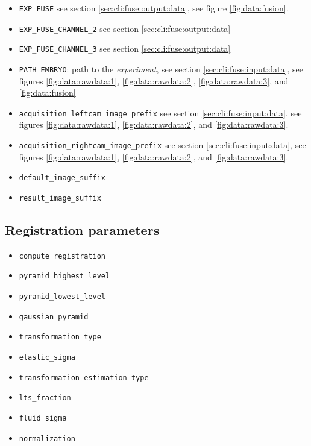 \begin{itemize}
\item \texttt{EXP\_FUSE} 
see section \ref{sec:cli:fuse:output:data},
see figure \ref{fig:data:fusion}.
\item \texttt{EXP\_FUSE\_CHANNEL\_2} 
see section \ref{sec:cli:fuse:output:data}
\item \texttt{EXP\_FUSE\_CHANNEL\_3} 
see section \ref{sec:cli:fuse:output:data}
\item \texttt{PATH\_EMBRYO}: path to the \textit{experiment}, 
see section \ref{sec:cli:fuse:input:data},
see figures \ref{fig:data:rawdata:1}, 
\ref{fig:data:rawdata:2}, 
\ref{fig:data:rawdata:3}, and
\ref{fig:data:fusion}
\item \texttt{acquisition\_leftcam\_image\_prefix}  
see section \ref{sec:cli:fuse:input:data},
see figures \ref{fig:data:rawdata:1}, 
\ref{fig:data:rawdata:2}, 
and \ref{fig:data:rawdata:3}.
\item \texttt{acquisition\_rightcam\_image\_prefix}  
see section \ref{sec:cli:fuse:input:data},
see figures \ref{fig:data:rawdata:1}, 
\ref{fig:data:rawdata:2}, 
and \ref{fig:data:rawdata:3}.
\item \texttt{default\_image\_suffix}
\item \texttt{result\_image\_suffix}
\end{itemize}





\subsection{Registration parameters}
\label{sec:cli:parameters:registration}

\begin{itemize}
\itemsep -0.5ex
\item \texttt{compute\_registration}
\item \texttt{pyramid\_highest\_level}
\item \texttt{pyramid\_lowest\_level}
\item \texttt{gaussian\_pyramid}
\item \texttt{transformation\_type}
\item \texttt{elastic\_sigma}
\item \texttt{transformation\_estimation\_type}
\item \texttt{lts\_fraction}
\item \texttt{fluid\_sigma}
\item \texttt{normalization}
\end{itemize}





